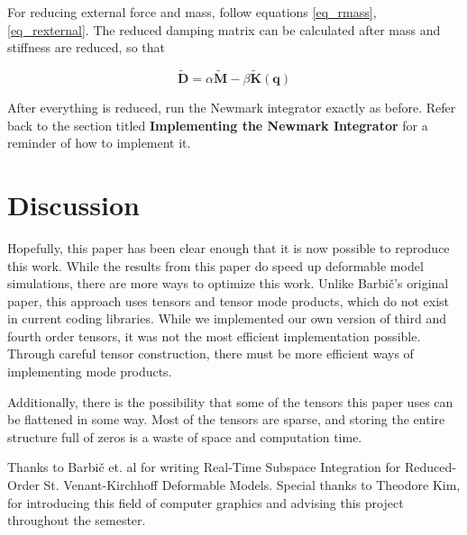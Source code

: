 \documentclass[twocolumn,10pt]{asme2ej}
\begin{document}
For reducing external force and mass, follow equations \ref{eq_rmass}, \ref{eq_rexternal}. The reduced damping matrix can be calculated after mass and stiffness are reduced, so that

\begin{equation}
  \bm{\tilde{D}} = \alpha\bm{\tilde{M}} - \beta\bm{\tilde{K}}(\bm{q})
\end{equation}

After everything is reduced, run the Newmark integrator exactly as before. Refer back to the section titled \textbf{Implementing the Newmark Integrator} for a reminder of how to implement it.

\section{Discussion}

Hopefully, this paper has been clear enough that it is now possible to reproduce this work. While the results from this paper do speed up deformable model simulations, there are more ways to optimize this work. Unlike Barbič's original paper, this approach uses tensors and tensor mode products, which do not exist in current coding libraries. While we implemented our own version of third and fourth order tensors, it was not the most efficient implementation possible. Through careful tensor construction, there must be more efficient ways of implementing mode products.

Additionally, there is the possibility that some of the tensors this paper uses can be flattened in some way. Most of the tensors are sparse, and storing the entire structure full of zeros is a waste of space and computation time.

\begin{acknowledgment}

Thanks to Barbič et. al for writing Real-Time Subspace Integration for Reduced-Order St. Venant-Kirchhoff Deformable Models. Special thanks to Theodore Kim, for introducing this field of computer graphics and advising this project throughout the semester.

\end{acknowledgment}



\end{document}
